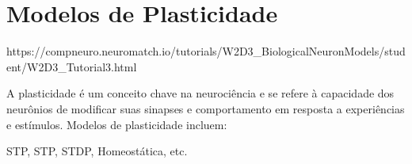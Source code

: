 \section{Modelos de Plasticidade}

https://compneuro.neuromatch.io/tutorials/W2D3_BiologicalNeuronModels/student/W2D3_Tutorial3.html


A plasticidade é um conceito chave na neurociência e se refere à capacidade dos neurônios de modificar suas sinapses e
comportamento em resposta a experiências e estímulos. Modelos de plasticidade incluem:

STP, STP, STDP, Homeostática, etc.

